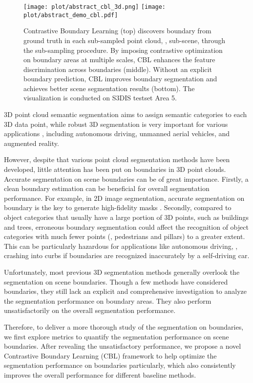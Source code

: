 \documentclass[10pt,twocolumn,letterpaper]{article}
\begin{document}
\begin{figure}
\begin{center} 
  \texttt{[image: plot/abstract\_cbl\_3d.png]}
   \texttt{[image: plot/abstract\_demo\_cbl.pdf]}
\end{center}
   \caption{Contrastive Boundary Learning (top) discovers boundary from ground truth in each sub-sampled point cloud, \ie, sub-scene, through the sub-sampling procedure. By imposing contrastive optimization on boundary areas at multiple scales, CBL enhances the feature discrimination across boundaries (middle). Without an explicit boundary prediction, CBL improves boundary segmentation and achieves better scene segmentation results (bottom). The visualization is conducted on S3DIS testset Area 5.
   }
\label{fig:abstract}
\end{figure}

3D point cloud semantic segmentation aims to assign semantic categories to each 3D data point, while robust 3D segmentation is very important for various applications \cite{ptsurvey, ptSreview}, including autonomous driving, unmanned aerial vehicles, and augmented reality.

However, despite that various point cloud segmentation methods have been developed, little attention has been put on boundaries in 3D point clouds. Accurate segmentation on scene boundaries can be of great importance. Firstly, a clean boundary estimation can be beneficial for overall segmentation performance. For example, in 2D image segmentation, accurate segmentation on boundary is the key to generate high-fidelity masks \cite{bound_bio,bound_iou,bound_loss}. Secondly, compared to object categories that usually have a large portion of 3D points, 
such as buildings and trees, erroneous boundary segmentation could affect the recognition of object categories with much fewer points (\eg, pedestrians and pillars) to a greater extent. This can be particularly hazardous for applications like autonomous driving, \eg, crashing into curbs if boundaries are recognized inaccurately by a self-driving car.


Unfortunately, most previous 3D segmentation methods generally overlook the segmentation on scene boundaries. Though a few methods have considered boundaries, they still lack an explicit and comprehensive investigation to analyze the segmentation performance on boundary areas. They also perform unsatisfactorily on the overall segmentation performance.

Therefore, to deliver a more thorough study of the segmentation on boundaries, we first explore metrics to quantify the segmentation performance on scene boundaries. After revealing the unsatisfactory performance, we propose a novel Contrastive Boundary Learning (CBL) framework to help optimize the segmentation performance on boundaries particularly, which also consistently improves the overall performance for different baseline methods.
\end{document}
